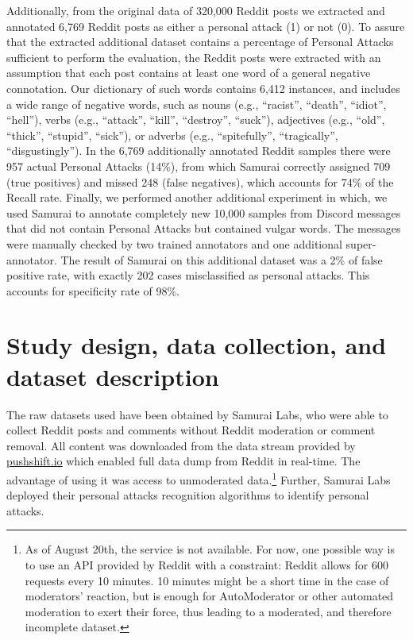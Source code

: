 \documentclass[10pt,]{scrartcl}
\begin{document}
Additionally, from the original data of 320,000 Reddit posts we
extracted and annotated 6,769 Reddit posts as either a personal attack
(1) or not (0). To assure that the extracted additional dataset contains
a percentage of Personal Attacks sufficient to perform the evaluation,
the Reddit posts were extracted with an assumption that each post
contains at least one word of a general negative connotation. Our
dictionary of such words contains 6,412 instances, and includes a wide
range of negative words, such as nouns (e.g., ``racist'', ``death'',
``idiot'', ``hell''), verbs (e.g., ``attack'', ``kill'', ``destroy'',
``suck''), adjectives (e.g., ``old'', ``thick'', ``stupid'', ``sick''),
or adverbs (e.g., ``spitefully'', ``tragically'', ``disgustingly''). In
the 6,769 additionally annotated Reddit samples there were 957 actual
Personal Attacks (14\%), from which Samurai correctly assigned 709 (true
positives) and missed 248 (false negatives), which accounts for 74\% of
the Recall rate. Finally, we performed another additional experiment in
which, we used Samurai to annotate completely new 10,000 samples from
Discord messages that did not contain Personal Attacks but contained
vulgar words. The messages were manually checked by two trained
annotators and one additional super-annotator. The result of Samurai on
this additional dataset was a 2\% of false positive rate, with exactly
202 cases misclassified as personal attacks. This accounts for
specificity rate of 98\%.

\section{Study design, data collection, and dataset description}

The raw datasets used have been obtained by \textsf{Samurai Labs}, who
were able to collect \textsf{Reddit} posts and comments without
\textsf{Reddit} moderation or comment removal. All content was
downloaded from the data stream provided by \url{pushshift.io} which
enabled full data dump from Reddit in real-time. The advantage of using
it was access to unmoderated
data.\footnote{As of August 20th, the service is not available. For now, one possible way is to use an API provided by Reddit with a constraint:  Reddit allows for 600 requests every 10 minutes. 10 minutes might be a short time in the case of moderators' reaction, but is enough for AutoModerator or other automated moderation to exert their force, thus leading to a moderated, and therefore incomplete dataset.}
Further, \textsf{Samurai Labs} deployed their personal attacks
recognition algorithms to identify personal attacks.
\end{document}
